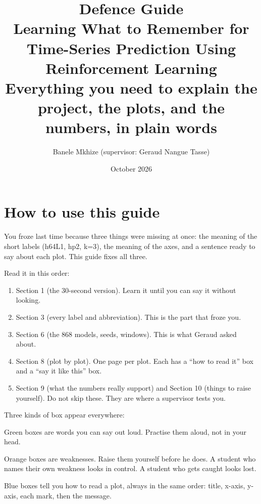 \documentclass[11pt,a4paper]{article}
\title{\vspace{-1.5cm}\textbf{Defence Guide}\\[4pt]
\large Learning What to Remember for Time-Series Prediction Using Reinforcement Learning\\[2pt]
\normalsize Everything you need to explain the project, the plots, and the numbers, in plain words}
\author{Banele Mkhize \quad (supervisor: Geraud Nangue Tasse)}
\date{October 2026}
\begin{document}
\maketitle
\vspace{-0.6cm}

\tableofcontents
\newpage

\section*{How to use this guide}

You froze last time because three things were missing at once: the meaning of the
short labels (h64L1, hp2, k=3), the meaning of the axes, and a sentence ready to say
about each plot. This guide fixes all three.

Read it in this order:
\begin{enumerate}
  \item Section 1 (the 30-second version). Learn it until you can say it without looking.
  \item Section 3 (every label and abbreviation). This is the part that froze you.
  \item Section 6 (the 868 models, seeds, windows). This is what Geraud asked about.
  \item Section 8 (plot by plot). One page per plot. Each has a ``how to read it'' box
        and a ``say it like this'' box.
  \item Section 9 (what the numbers really support) and Section 10 (things to raise
        yourself). Do not skip these. They are where a supervisor tests you.
\end{enumerate}

Three kinds of box appear everywhere:
\begin{sayit}Green boxes are words you can say out loud. Practise them aloud, not in your head.\end{sayit}
\begin{honest}Orange boxes are weaknesses. Raise them yourself before he does. A student who
names their own weakness looks in control. A student who gets caught looks lost.\end{honest}
\begin{axes}Blue boxes tell you how to read a plot, always in the same order: title, x-axis,
y-axis, each mark, then the message.\end{axes}
\end{document}
